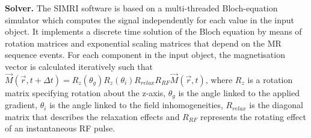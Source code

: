 \hfill

\textbf{Solver.} The SIMRI software is based on a multi-threaded Bloch-equation simulator which computes the signal independently for each value in the input object.
It implements a discrete time solution of the Bloch equation by means of rotation matrices and exponential scaling matrices that depend on the MR sequence events.
For each component in the input object, the magnetisation vector is calculated iteratively such that $\vec{M}(\vec{r},t + \Delta t) = R_z(\theta_g) R_z(\theta_i) R_{relax} R_{RF} \vec{M}(\vec{r},t)$,
where $R_z$ is a rotation matrix specifying rotation about the z-axis,
$\theta_g$ is the angle linked to the applied gradient, 
$\theta_i$ is the angle linked to the field inhomogeneities,
$R_{relax}$ is the diagonal matrix that describes the relaxation effects and
$R_{RF}$ represents the rotating effect of an instantaneous RF pulse.





    
    
